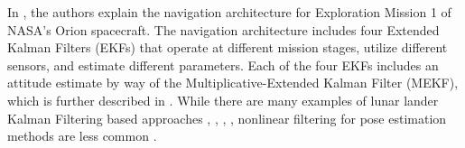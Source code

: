 \documentclass[conf]{new-aiaa}
\begin{document}
In \cite{holt2018orion}, the authors explain the navigation architecture for Exploration Mission 1 of NASA's Orion spacecraft. The navigation architecture includes four Extended Kalman Filters (EKFs) that operate at different mission stages, utilize different sensors, and estimate different parameters. Each of the four EKFs includes an attitude estimate by way of the Multiplicative-Extended Kalman Filter (MEKF), which is further described in \cite{markley2004multiplicative}. While there are many examples of lunar lander Kalman Filtering based approaches \cite{christensen2011terrain}, \cite{givens2023square}, \cite{holt2018orion}, \cite{maass2020crater}, nonlinear filtering for pose estimation methods are less common \cite{cauligi2023shadownav}.

\end{document}
